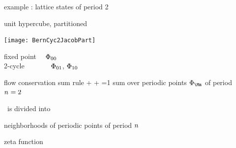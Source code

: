 \begin{frame}{example : lattice states of period 2}
    \begin{block}{unit hypercube, partitioned}
\begin{center}
            \begin{minipage}[c]{0.32\textwidth}\begin{center}
\texttt{[image: BernCyc2JacobPart]}
            \end{center}\end{minipage}
            \hspace{2ex}
            \begin{minipage}[c]{0.46\textwidth}
fixed point ~~$\Phi_{00}$\\
2-cycle ~~~~~~~$\Phi_{01}$, $\Phi_{10}$
            \end{minipage}
\end{center}
    \end{block}
\medskip

\begin{block}{
 {flow
conservation} sum rule
            }
\beq
   +    
   + 
    =1
\eeq
    {\footnotesize
sum over periodic points $\Xx_{\Mm}$ of period ${n_{}}=2$
    }
\end{block}

\statesp\ is divided into

\hfill
{\color{blue}neighborhoods} of periodic points of period ${n_{}}$
\end{frame} %

\begin{frame}{}
\vfill
\begin{center}
{\huge zeta function}
\end{center}
\vfill
\end{frame} %


